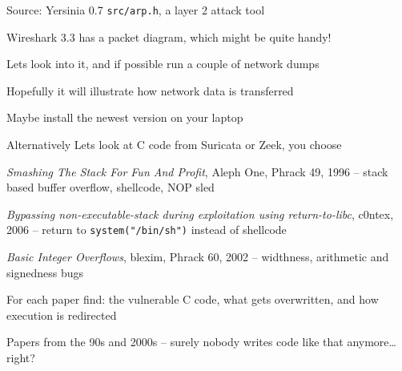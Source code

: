 \documentclass[Screen16to9,17pt]{foils}
\begin{document}
Source: Yersinia 0.7 \verb+src/arp.h+, a layer 2 attack tool




\begin{list2}
\item Wireshark 3.3 has a packet diagram, which might be quite handy!
\item Lets look into it, and if possible run a couple of network dumps
\item Hopefully it will illustrate how network data is transferred
\item Maybe install the newest version on your laptop
\item Alternatively Lets look at C code from Suricata or Zeek, you choose
\end{list2}





\begin{list2}
\item \emph{Smashing The Stack For Fun And Profit}, Aleph One, Phrack 49, 1996 -- stack based buffer overflow, shellcode, NOP sled\\
{\footnotesize{}}
\item \emph{Bypassing non-executable-stack during exploitation using return-to-libc}, c0ntex, 2006 -- return to \verb+system("/bin/sh")+ instead of shellcode\\
{\footnotesize{}}
\item \emph{Basic Integer Overflows}, blexim, Phrack 60, 2002 -- widthness, arithmetic and signedness bugs\\
{\footnotesize{}}
\end{list2}

For each paper find: the vulnerable C code, what gets overwritten, and how execution is redirected

\vskip 5mm
\centerline{Papers from the 90s and 2000s -- surely nobody writes code like that anymore\dots right?}


\end{document}
